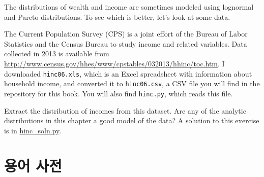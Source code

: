 \begin{exercise}
\label{income}

The distributions of wealth and income are sometimes modeled using
lognormal and Pareto distributions.  To see which is better, let's
look at some data.

The Current Population Survey (CPS) is a joint effort of the Bureau
of Labor Statistics and the Census Bureau to study income and related
variables.  Data collected in 2013 is available from
\url{http://www.census.gov/hhes/www/cpstables/032013/hhinc/toc.htm}.
I downloaded {\tt hinc06.xls}, which is an Excel spreadsheet with
information about household income, and converted it to {\tt hinc06.csv},
a CSV file you will find in the repository for this book.  You
will also find {\tt hinc.py}, which reads this file.

Extract the distribution of incomes from this dataset.  Are any of the
analytic distributions in this chapter a good model of the data?  A
solution to this exercise is in \url{hinc_soln.py}.

\end{exercise}




\section{용어 사전}


